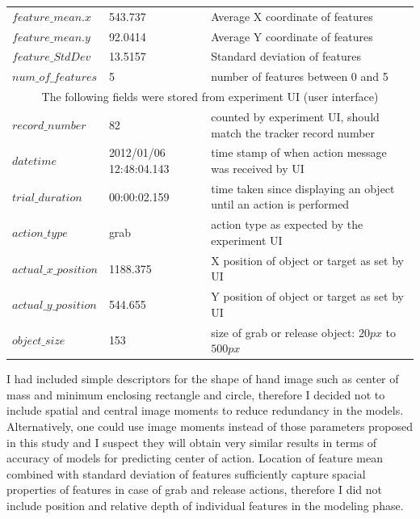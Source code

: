 \begin{center}
\begin{table}
\begin{tabular}{|l p{2cm} p{9cm}|}
$feature\_mean.x$ & 543.737 & Average X coordinate of features\\
$feature\_mean.y$ & 92.0414 & Average Y coordinate of features\\
$feature\_StdDev$ & 13.5157 & Standard deviation of features\\
$num\_of\_features$ & 5 & number of features between 0 and 5\\
\hline
\multicolumn{3}{|c|}{The following fields were stored from experiment UI (user
interface)}\\
\hline
$record\_number$ & 82 & counted by experiment UI, should match the tracker record number\\
$datetime$ & 2012/01/06 12:48:04.143 & time stamp of when action message was received by UI\\
$trial\_duration$ & 00:00:02.159 & time taken since displaying an object until an action is performed\\
$action\_type$ & grab & action type as expected by the experiment UI \\
$actual\_x\_position$ & 1188.375 & X position of object or target as set by UI\\
$actual\_y\_position$ & 544.655 & Y position of object or target as set by UI\\
$object\_size$ & 153 & size of grab or release object: $20px$ to $500px$\\
\hline
\end{tabular}
\end{table}
\end{center}

I had included simple descriptors for the shape of hand image such as center of mass and minimum enclosing rectangle and circle, therefore I decided not to include spatial and central image moments to reduce redundancy in the models.
Alternatively, one could use image moments instead of those parameters proposed in this study and I suspect they will obtain very similar results in terms of accuracy of models for predicting center of action.
Location of feature mean combined with standard deviation of features sufficiently capture spacial properties of features in case of grab and release actions, therefore I did not include position and relative depth of individual features in the modeling phase.